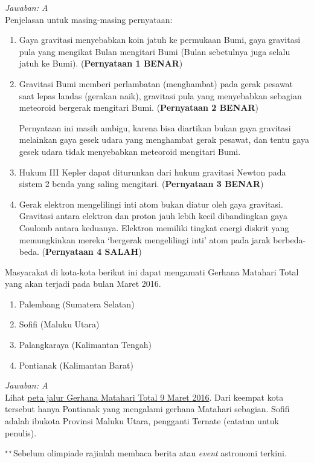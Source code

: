 \documentclass[11pt,fleqn, a4paper]{exam}
\begin{document}
\begin{questions}
\textit{Jawaban: A}\\
Penjelasan untuk masing-masing pernyataan:
\begin{enumerate}
\item Gaya gravitasi menyebabkan koin jatuh ke permukaan Bumi, gaya gravitasi pula yang mengikat Bulan mengitari Bumi (Bulan sebetulnya juga selalu jatuh ke Bumi). (\textbf{Pernyataan 1 BENAR})
\item Gravitasi Bumi memberi perlambatan (menghambat) pada gerak pesawat saat lepas landas (gerakan naik), gravitasi pula yang menyebabkan sebagian meteoroid bergerak mengitari Bumi. (\textbf{Pernyataan 2 BENAR})

Pernyataan ini masih ambigu, karena bisa diartikan bukan gaya gravitasi melainkan gaya gesek udara yang menghambat gerak pesawat, dan tentu gaya gesek udara tidak menyebabkan meteoroid mengitari Bumi. 
\item Hukum III Kepler dapat diturunkan dari hukum gravitasi Newton pada sistem 2 benda yang saling mengitari. (\textbf{Pernyataan 3 BENAR})
\item Gerak elektron mengelilingi inti atom bukan diatur oleh gaya gravitasi. Gravitasi antara elektron dan proton jauh lebih kecil dibandingkan gaya Coulomb antara keduanya. Elektron memiliki tingkat energi diskrit yang memungkinkan mereka `bergerak mengelilingi inti' atom pada jarak berbeda-beda. (\textbf{Pernyataan 4 SALAH})
\end{enumerate}

\question Masyarakat di kota-kota berikut ini dapat mengamati Gerhana Matahari Total yang akan terjadi pada bulan Maret 2016.
\begin{enumerate}
\item Palembang (Sumatera Selatan)
\item Sofifi (Maluku Utara)
\item Palangkaraya (Kalimantan Tengah)
\item Pontianak (Kalimantan Barat)
\end{enumerate}

\textit{Jawaban: A}\\
Lihat \href{http://xjubier.free.fr/en/site_pages/solar_eclipses/TSE_2016_GoogleMapFull.html}
{peta jalur Gerhana Matahari Total 9 Maret 2016}. Dari keempat kota tersebut hanya Pontianak yang mengalami gerhana Matahari sebagian. Sofifi adalah ibukota Provinsi Maluku Utara, pengganti Ternate (catatan untuk penulis).

$^{\star\star}$Sebelum olimpiade rajinlah membaca berita atau \textit{event} astronomi terkini. 



\end{questions}
\end{document}
